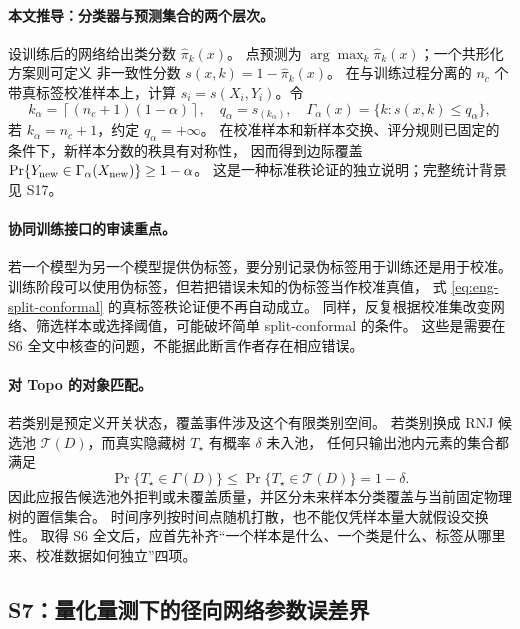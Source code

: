 \documentclass[UTF8,11pt,fontset=fandol]{ctexart}
\theoremstyle{remark}
\numberwithin{equation}{section}
\begin{document}
\paragraph{本文推导：分类器与预测集合的两个层次。}
设训练后的网络给出类分数 $\widehat\pi_k(x)$。
点预测为 $\arg\max_k\widehat\pi_k(x)$；一个共形化方案则可定义
非一致性分数 $s(x,k)=1-\widehat\pi_k(x)$。
在与训练过程分离的 $n_c$ 个带真标签校准样本上，计算
$s_i=s(X_i,Y_i)$。令
\begin{equation}
 k_\alpha=\left\lceil(n_c+1)(1-\alpha)\right\rceil,
 \quad q_\alpha=s_{(k_\alpha)},
 \quad \Gamma_\alpha(x)=\{k:s(x,k)\leq q_\alpha\},
 \label{eq:eng-split-conformal}
\end{equation}
若 $k_\alpha=n_c+1$，约定 $q_\alpha=+\infty$。
在校准样本和新样本交换、评分规则已固定的条件下，新样本分数的秩具有对称性，
因而得到边际覆盖 $\Pr\{Y_{\rm new}\in\Gamma_\alpha(X_{\rm new})\}\geq1-\alpha$。
这是一种标准秩论证的独立说明；完整统计背景见 S17。

\paragraph{协同训练接口的审读重点。}
若一个模型为另一个模型提供伪标签，要分别记录伪标签用于训练还是用于校准。
训练阶段可以使用伪标签，但若把错误未知的伪标签当作校准真值，
式 \eqref{eq:eng-split-conformal} 的真标签秩论证便不再自动成立。
同样，反复根据校准集改变网络、筛选样本或选择阈值，可能破坏简单 split-conformal 的条件。
这些是需要在 S6 全文中核查的问题，不能据此断言作者存在相应错误。

\paragraph{对 Topo 的对象匹配。}
若类别是预定义开关状态，覆盖事件涉及这个有限类别空间。
若类别换成 RNJ 候选池 $\mathcal T(D)$，而真实隐藏树 $T_\star$ 有概率 $\delta$ 未入池，
任何只输出池内元素的集合都满足
\begin{equation}
 \Pr\{T_\star\in\Gamma(D)\}\leq
 \Pr\{T_\star\in\mathcal T(D)\}=1-\delta.
 \label{eq:eng-pool-ceiling}
\end{equation}
因此应报告候选池外拒判或未覆盖质量，并区分未来样本分类覆盖与当前固定物理树的置信集合。
时间序列按时间点随机打散，也不能仅凭样本量大就假设交换性。
取得 S6 全文后，应首先补齐“一个样本是什么、一个类是什么、标签从哪里来、校准数据如何独立”四项。

\subsection{S7：量化量测下的径向网络参数误差界}
\label{subsec:S7}
\end{document}
